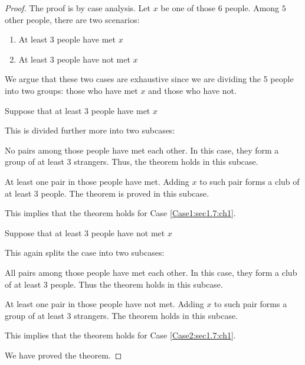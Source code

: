 \begin{proof}
    The proof is by case analysis. Let $x$ be one of those $6$ people. Among $5$ other people,
    there are two scenarios:
    \begin{enumerate}
        \item At least $3$ people have met $x$
        \item At least $3$ people have not met $x$
    \end{enumerate}
    We argue that these two cases are exhaustive since we are dividing the 5 people
    into two groups: those who have met $x$ and those who have not.
    \begin{casesp}
        \item \label{Case1:sec1.7:ch1} Suppose that at least $3$ people have met $x$
        
        This is divided further more into two subcases:

        \begin{casesp}
            \item No pairs among those people have met each other. In this case,
            they form a group of at least $3$ strangers. Thus, the theorem holds in this
            subcase.
            \item At least one pair in those people have met. Adding $x$ to such pair
            forms a club of at least $3$ people. The theorem is proved in this subcase.
        \end{casesp}

        This implies that the theorem holds for Case \ref{Case1:sec1.7:ch1}.

        \item \label{Case2:sec1.7:ch1} Suppose that at least $3$ people have not met $x$
        
        This again splits the case into two subcases:

        \begin{casesp}
            \item All pairs among those people have met each other. In this case,
            they form a club of at least $3$ people. Thus the theorem holds in this subcase.
            \item At least one pair in those people have not met. Adding $x$ to
            such pair forms a group of at least $3$ strangers. The theorem holds in this subcase.
        \end{casesp}

        This implies that the theorem holds for Case \ref{Case2:sec1.7:ch1}.

    \end{casesp}
    We have proved the theorem.
\end{proof}

